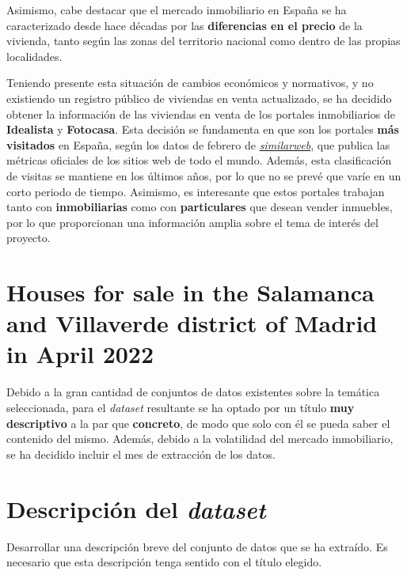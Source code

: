 \documentclass[12pt]{article}
\begin{document}
Asimismo, cabe destacar que el mercado inmobiliario en España se ha caracterizado desde hace décadas por las \textbf{diferencias en el precio} de la vivienda, tanto según las zonas del territorio nacional como dentro de las propias localidades. 

Teniendo presente esta situación de cambios económicos y normativos, y no existiendo un registro público de viviendas en venta actualizado, se ha decidido obtener la información de las viviendas en venta de los portales inmobiliarios de \textbf{Idealista} y \textbf{Fotocasa}. Esta decisión se fundamenta en que son los portales \textbf{más visitados} en España, según los datos de febrero de \href{https://www.similarweb.com/top-websites/spain/category/business-and-consumer-services/real-estate/}{\textit{similarweb}}, que publica las métricas oficiales de los sitios web de todo el mundo. Además, esta clasificación de visitas se mantiene en los últimos años, por lo que no se prevé que varíe en un corto periodo de tiempo. Asimismo, es interesante que estos portales trabajan tanto con \textbf{inmobiliarias} como con \textbf{particulares} que desean vender inmuebles, por lo que proporcionan una información amplia sobre el tema de interés del proyecto.

\vspace{-1.5em}\section{Houses for sale in the Salamanca and Villaverde district of Madrid in April 2022}\vspace{-1.5em}

Debido a la gran cantidad de conjuntos de datos existentes sobre la temática seleccionada, para el \textit{dataset} resultante se ha optado por un título \textbf{muy descriptivo} a la par que \textbf{concreto}, de modo que solo con él se pueda saber el contenido del mismo. Además, debido a la volatilidad del mercado inmobiliario, se ha decidido incluir el mes de extracción de los datos.

\vspace{-1.5em}\section{Descripción del \textit{dataset}}\vspace{-1.5em}

Desarrollar una descripción breve del conjunto de
datos que se ha extraído. Es necesario que esta descripción tenga sentido con
el título elegido.
\end{document}
